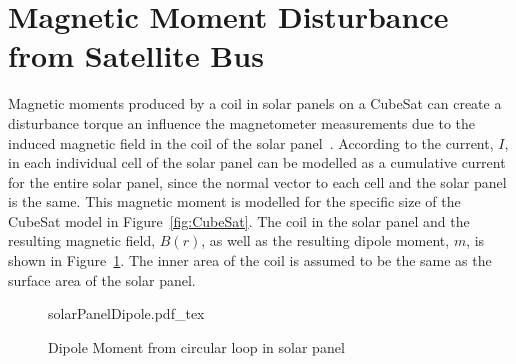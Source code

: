 \section{Magnetic Moment Disturbance from Satellite Bus}
Magnetic moments produced by a coil in solar panels on a CubeSat can create a disturbance torque an influence the magnetometer measurements due to the induced magnetic field in the coil of the solar panel~\cite{Ruckerl2019, Jeger2017}. According to \cite{Jeger2017} the current, $I$, in each individual cell of the solar panel can be modelled as a cumulative current for the entire solar panel, since the normal vector to each cell and the solar panel is the same. This magnetic moment is modelled for the specific size of the CubeSat model in Figure~\ref{fig:CubeSat}. The coil in the solar panel and the resulting magnetic field, $B(r)$, as well as the resulting dipole moment, $m$, is shown in Figure~\ref{fig:solarPanelDipole}. The inner area of the coil is assumed to be the same as the surface area of the solar panel. 

\begin{figure}[!hbt]
	\centering
	\def\svgwidth{14cm}
	{solarPanelDipole.pdf_tex}
	\caption{Dipole Moment from circular loop in solar panel}
	\label{fig:solarPanelDipole}
\end{figure}

